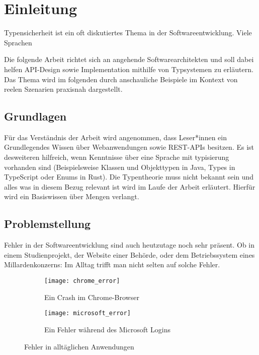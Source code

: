 \section{Einleitung} 


Typensicherheit ist ein oft diskutiertes Thema in der Softwareentwicklung. 
Viele Sprachen 

Die folgende Arbeit richtet sich an angehende Softwarearchitekten und soll dabei helfen API-Design sowie Implementation
mithilfe von Typsystemen zu erläutern.
Das Thema wird im folgenden durch anschauliche Beispiele im Kontext von reelen Szenarien praxisnah dargestellt.

\subsection{Grundlagen}

Für das Verständnis der Arbeit wird angenommen, dass Leser*innen ein Grundlegendes Wissen über Webanwendungen sowie REST-APIs besitzen.
Es ist desweiteren hilfreich, wenn Kenntnisse über eine Sprache mit typisierung vorhanden sind
(Beispielsweise Klassen und Objekttypen in Java, Types in TypeScript oder Enums in Rust).
Die Typentheorie muss nicht bekannt sein und alles was in diesem Bezug relevant ist wird im Laufe der Arbeit erläutert. 
Hierfür wird ein Basiswissen über Mengen verlangt.


\subsection{Problemstellung} 

Fehler in der Softwareentwicklung sind auch heutzutage noch sehr präsent. Ob in einem Studienprojekt, der Website einer Behörde,
oder dem Betriebssystem eines Millardenkonzerns: Im Alltag trifft man nicht selten auf solche Fehler.

\begin{figure}[H]
  \centering
  \begin{subfigure}[b]{0.4\linewidth}
    \texttt{[image: chrome\_error]}
    \caption{Ein Crash im Chrome-Browser}
  \end{subfigure}
  \hspace{0.5cm}
  \begin{subfigure}[b]{0.4\linewidth}
    \texttt{[image: microsoft\_error]}
    \caption{Ein Fehler während des Microsoft Logins}
  \end{subfigure}
  \caption{Fehler in alltäglichen Anwendungen}
\end{figure}

